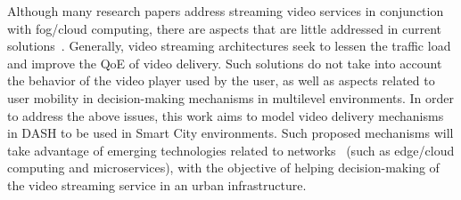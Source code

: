 Although many research papers address streaming video services in conjunction with fog/cloud computing, there are aspects that are little addressed in current solutions~\cite{Mouradian2018ComSurv, bentaeb:2018:MSys}. Generally, video streaming architectures seek to lessen the traffic load and improve the QoE of video delivery.
Such solutions do not take into account the behavior of the video player used by the user, as well as aspects related to user mobility in decision-making mechanisms in multilevel environments.
In order to address the above issues, this work aims to model video delivery mechanisms in DASH
to be used in Smart City environments. Such proposed mechanisms will take advantage of emerging technologies related to networks~ (such as edge/cloud computing and microservices), with the objective of helping decision-making of the video streaming service in an urban infrastructure.

